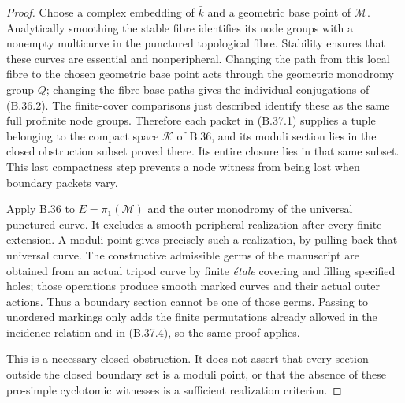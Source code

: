 \begin{proof}
Choose a complex embedding of $\bar k$ and a geometric
base point of $\mathcal M$. Analytically smoothing the
stable fibre identifies its node groups with a nonempty
multicurve in the punctured topological fibre. Stability
ensures that these curves are essential and
nonperipheral. Changing the path from this local fibre
to the chosen geometric base point acts through the
geometric monodromy group $Q$; changing the fibre base
paths gives the individual conjugations of (B.36.2).
The finite-cover comparisons just described identify
these as the same full profinite node groups. Therefore
each packet in (B.37.1) supplies a tuple belonging to
the compact space $\mathcal K$ of B.36, and its moduli
section lies in the closed obstruction subset proved
there. Its entire closure lies in that same subset.
This last compactness step prevents a node witness
from being lost when boundary packets vary.

Apply B.36 to $E=\pi_1(\mathcal M)$ and the outer
monodromy of the universal punctured curve. It excludes
a smooth peripheral realization after every finite
extension. A moduli point gives precisely such a
realization, by pulling back that universal curve.
The constructive admissible germs of the manuscript
are obtained from an actual tripod curve by finite
\emph{\'etale} covering and filling specified holes;
those operations produce smooth marked curves and
their actual outer actions. Thus a boundary section
cannot be one of those germs. Passing to unordered
markings only adds the finite permutations already
allowed in the incidence relation and in (B.37.4), so
the same proof applies.

This is a necessary closed obstruction. It does not
assert that every section outside the closed boundary
set is a moduli point, or that the absence of these
pro-simple cyclotomic witnesses is a sufficient
realization criterion.
\end{proof}

